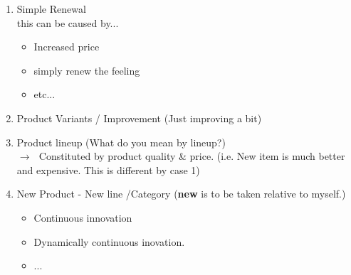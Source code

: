 \documentclass[12pt]{article}
\newcommand{\ra}{$\rightarrow \text{ }$}
\begin{document}
\begin{enumerate}
	\item Simple Renewal \\
	this can be caused by...
	\begin{itemize}
		\item Increased price
		\item simply renew the feeling
		\item etc...
	\end{itemize}
	 \item Product Variants / Improvement (Just improving a bit)
	 \item Product lineup (What do you mean by lineup?) \\
	 \ra Constituted by product quality \& price. (i.e. New item is much better and expensive. This is different by case 1)
	 \item New Product - New line /Category (\textbf{new} is to be taken relative to myself.) \\
	 \begin{itemize}
	 	\item Continuous innovation
		\item Dynamically continuous inovation.
		\item ...
	 \end{itemize}

\end{enumerate}
\end{document}
